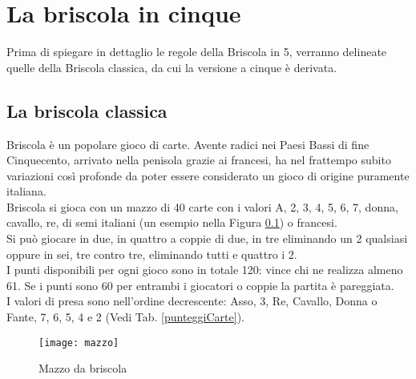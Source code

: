 
\chapter*{La briscola in cinque}


\ifpdf
    \graphicspath{{Chapter1/Chapter1Figs/PNG/}{Chapter1/Chapter1Figs/PDF/}{Chapter1/Chapter1Figs/}}
\else
    \graphicspath{{Chapter1/Chapter1Figs/EPS/}{Chapter1/Chapter1Figs/}}
\fi


Prima di spiegare in dettaglio le regole della Briscola in 5, verranno delineate quelle della Briscola classica, da cui la versione a cinque è derivata.


\section{La briscola classica}


Briscola è un popolare gioco di carte. Avente radici nei Paesi Bassi di fine Cinquecento, arrivato nella penisola grazie ai francesi, ha nel frattempo subito variazioni così profonde da poter essere considerato un gioco di origine puramente italiana. \cite{giochidicarte}\\
Briscola si gioca con un mazzo di 40 carte con i valori A, 2, 3, 4, 5, 6, 7, donna, cavallo, re, di semi italiani (un esempio nella Figura \ref{MazzoBriscola}) o francesi. \\
Si può giocare in due, in quattro a coppie di due, in tre eliminando un 2 qualsiasi oppure in sei, tre contro tre, eliminando tutti e quattro i 2. \cite{giochidicarte}\\
I punti disponibili per ogni gioco sono in totale 120: vince chi ne realizza almeno 61. Se i punti sono 60 per entrambi i giocatori o coppie la partita è pareggiata.\\
I valori di presa sono nell'ordine decrescente: Asso, 3, Re, Cavallo, Donna o Fante, 7, 6, 5, 4 e 2 (Vedi Tab. \ref{punteggiCarte}).


\begin{figure}[!htbp]
  \begin{center}
    \leavevmode
      \texttt{[image: mazzo]}
    \caption{Mazzo da briscola}
    \label{MazzoBriscola}
  \end{center}
\end{figure}


